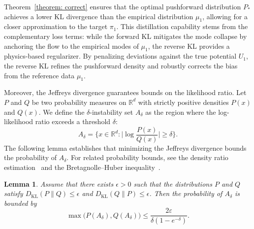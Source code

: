 \documentclass[%
 reprint,
 amsmath,amssymb,
 aps,
 pre,
]{revtex4-2}
\newtheorem{lemma}{Lemma}
\DeclareMathOperator{\KL}{KL}
\newcommand{\Ge}{\geqslant}
\newcommand{\Le}{\leqslant}
\newcommand{\ep}{\varepsilon}
\begin{document}
Theorem~\ref{theorem: correct} ensures that the optimal pushforward distribution $P_*$ achieves a lower KL divergence than the empirical distribution $\mu_1$, allowing for a closer approximation to the target $\pi_1$. This distillation capability stems from the complementary loss terms: while the forward KL mitigates the mode collapse by anchoring the flow to the empirical modes of $\mu_1$, the reverse KL provides a physics-based regularizer. By penalizing deviations against the true potential $U_1$, the reverse KL refines the pushforward density and robustly corrects the bias from the reference data $\mu_1$.

Moreover, the Jeffreys divergence guarantees bounds on the likelihood ratio. Let $P$ and $Q$ be two probability measures on $\mathbb R^d$ with strictly positive densities $P(x)$ and $Q(x)$. We define the $\delta$-instability set $A_\delta$ as the region where the log-likelihood ratio exceeds a threshold $\delta$:
\begin{equation}
	A_\delta = \bigg\{x\in\mathbb R^d:
	\bigg|\log \frac{P(x)}{Q(x)}\bigg| \Ge \delta
	\bigg\}.
\end{equation}
The following lemma establishes that minimizing the Jeffreys divergence bounds the probability of $A_\delta$. For related probability bounds, see the density ratio estimation~\cite{sugiyama2012density} and the Bretagnolle--Huber inequality~\cite{tsybakov2008nonparametric}.
\begin{lemma}
	\label{lemma: concentration}
	Assume that there exists $\epsilon>0$ such that the distributions $P$ and $Q$ satisfy $D_{\KL}(P\|Q) \Le \epsilon$ and $D_{\KL}(Q\|P) \Le \epsilon$. Then the probability of $A_\delta$ is bounded by
	\begin{equation}
		\max\big(P(A_\delta),Q(A_\delta)\big) \Le \frac{2\ep}{\delta(1-e^{-\delta})}.
		\label{eq: mPQb}
	\end{equation}
\end{lemma}
\end{document}
